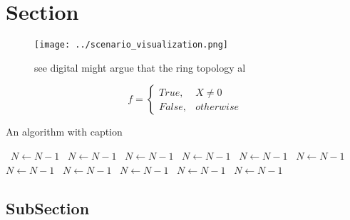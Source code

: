 \documentclass[a4paper]{article}
\begin{document}
\section{Section}

\begin{figure}
\centering
\texttt{[image: ../scenario\_visualization.png]}
\caption{see digital might argue that the ring topology al
}
\end{figure}
 
\begin{equation}   f =
\begin{cases} True, & X \neq 0\\
False, & otherwise
\end{cases}
\end{equation}

\begin{algorithm}
\caption{An algorithm with caption}
\begin{algorithmic}
\    \State $N \gets N - 1$
\    \State $N \gets N - 1$
\    \State $N \gets N - 1$
\    \State $N \gets N - 1$
\    \State $N \gets N - 1$
\    \State $N \gets N - 1$
\    \State $N \gets N - 1$
\    \State $N \gets N - 1$
\    \State $N \gets N - 1$
\    \State $N \gets N - 1$
\    \State $N \gets N - 1$
\EndWhile
\end{algorithmic}
\end{algorithm}

\subsection{SubSection}
\end{document}
